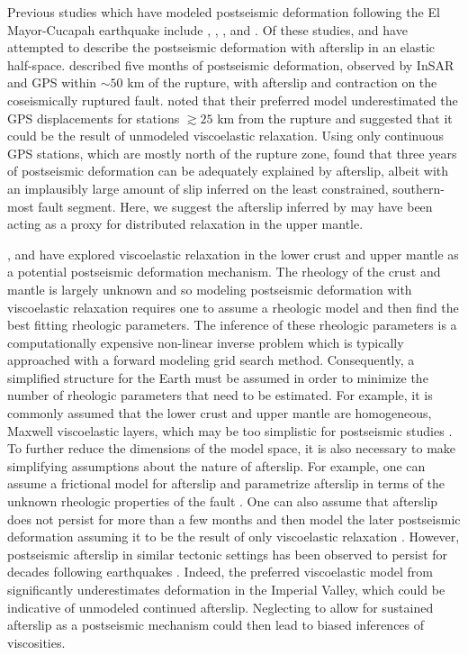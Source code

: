 \documentclass[draft,linenumbers]{AGUJournal}
\begin{document}
Previous studies which have modeled postseismic deformation following the El Mayor-Cucapah earthquake include \citet{Pollitz2012}, \citet{Gonzalez-ortega2014}, \citet{Spinler2015}, and \citet{Rollins2015}. Of these studies, \citet{Gonzalez-ortega2014} and \citet{Rollins2015} have attempted to describe the postseismic deformation with afterslip in an elastic half-space.  \citet{Gonzalez-ortega2014} described five months of postseismic deformation, observed by InSAR and GPS within ${\sim}50$ km of the rupture, with afterslip and contraction on the coseismically ruptured fault. \citet{Gonzalez-ortega2014} noted that their preferred model underestimated the GPS displacements for stations $\gtrsim 25$ km from the rupture and suggested that it could be the result of unmodeled viscoelastic relaxation.  Using only continuous GPS stations, which are mostly north of the rupture zone, \citet{Rollins2015} found that three years of postseismic deformation can be adequately explained by afterslip, albeit with an implausibly large amount of slip inferred on the least constrained, southern-most fault segment. Here, we suggest the afterslip inferred by \citet{Rollins2015} may have been acting as a proxy for distributed relaxation in the upper mantle. 

\citet{Pollitz2012}, \citet{Rollins2015} and \citet{Spinler2015} have explored viscoelastic relaxation in the lower crust and upper mantle as a potential postseismic deformation mechanism. The rheology of the crust and mantle is largely unknown and so modeling postseismic deformation with viscoelastic relaxation requires one to assume a rheologic model and then find the best fitting rheologic parameters.  The inference of these rheologic parameters is a computationally expensive non-linear inverse problem which is typically approached with a forward modeling grid search method.  Consequently, a simplified structure for the Earth must be assumed in order to minimize the number of rheologic parameters that need to be estimated.  For example, it is commonly assumed that the lower crust and upper mantle are homogeneous, Maxwell viscoelastic layers, which may be too simplistic for postseismic studies  \citep{Riva2009,Hines2013}. To further reduce the dimensions of the model space, it is also necessary to make simplifying assumptions about the nature of afterslip. For example, one can assume a frictional model for afterslip and parametrize afterslip in terms of the unknown rheologic properties of the fault \citep[e.g.][]{Johnson2009,Johnson2004}. One can also assume that afterslip does not persist for more than a few months and then model the later postseismic deformation assuming it to be the result of only viscoelastic relaxation \citep[e.g.][]{Pollitz2012,Spinler2015}. However, postseismic afterslip in similar tectonic settings has been observed to persist for decades following earthquakes \citep{Cakir2012,Cetin2014}. Indeed, the preferred viscoelastic model from \citet{Pollitz2012} significantly underestimates deformation in the Imperial Valley, which could be indicative of unmodeled continued afterslip.  Neglecting to allow for sustained afterslip as a postseismic mechanism could then lead to biased inferences of viscosities. 
\end{document}
